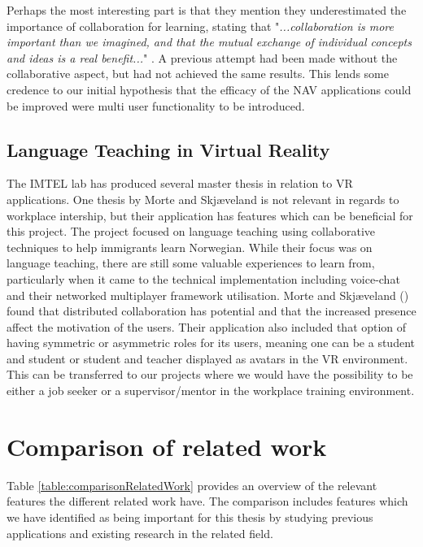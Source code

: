 Perhaps the most interesting part is that they mention they underestimated the importance of collaboration for learning, stating that "\textit{...collaboration is more important than we imagined, and that the mutual exchange of individual concepts and ideas is a real benefit...}" \cite{kockro2007collaborative}. A previous attempt had been made without the collaborative aspect, but had not achieved the same results. This lends some credence to our initial hypothesis that the efficacy of the NAV applications could be improved were multi user functionality to be introduced. 

\subsection{Language Teaching in Virtual Reality}
The IMTEL lab has produced several master thesis in relation to VR applications. One thesis by  Morte and Skjæveland \cite{morte2019effects} is not relevant in regards to workplace intership, but their application has features which can be beneficial for this project. The project focused on language teaching using collaborative techniques to help immigrants learn Norwegian. While their focus was on language teaching, there are still some valuable experiences to learn from, particularly when it came to the technical implementation including voice-chat and their networked multiplayer framework utilisation. Morte and Skjæveland (\citeyear{morte2019effects}) found that distributed collaboration has potential and that the increased presence affect the motivation of the  users. Their application also included that option of having symmetric or asymmetric roles for its users, meaning one can be a student and student or student and teacher displayed as avatars in the VR environment. This can be transferred to our projects where we would have the possibility to be either a job seeker or a supervisor/mentor in the workplace training environment.     

\section{Comparison of related work}
Table \ref{table:comparisonRelatedWork} provides an overview of the relevant features the different related work have. The comparison includes features which we have identified as being important for this thesis by studying previous applications and existing research in the related field. 

